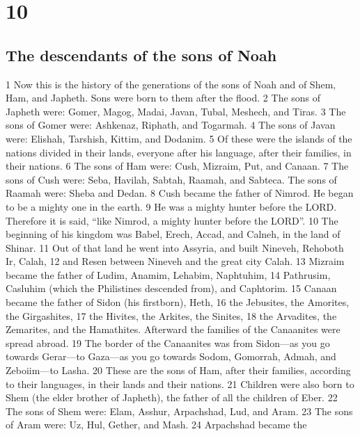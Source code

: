 \hypertarget{section-9}{%
\section{10}\label{section-9}}

\hypertarget{the-descendants-of-the-sons-of-noah}{%
\subsection{The descendants of the sons of
Noah}\label{the-descendants-of-the-sons-of-noah}}

{1} Now this is the history of the generations of the sons of Noah and
of Shem, Ham, and Japheth. Sons were born to them after the flood. {2}
The sons of Japheth were: Gomer, Magog, Madai, Javan, Tubal, Meshech,
and Tiras. {3} The sons of Gomer were: Ashkenaz, Riphath, and Togarmah.
{4} The sons of Javan were: Elishah, Tarshish, Kittim, and Dodanim. {5}
Of these were the islands of the nations divided in their lands,
everyone after his language, after their families, in their nations. {6}
The sons of Ham were: Cush, Mizraim, Put, and Canaan. {7} The sons of
Cush were: Seba, Havilah, Sabtah, Raamah, and Sabteca. The sons of
Raamah were: Sheba and Dedan. {8} Cush became the father of Nimrod. He
began to be a mighty one in the earth. {9} He was a mighty hunter before
the LORD. Therefore it is said, ``like Nimrod, a mighty hunter before
the LORD''. {10} The beginning of his kingdom was Babel, Erech, Accad,
and Calneh, in the land of Shinar. {11} Out of that land he went into
Assyria, and built Nineveh, Rehoboth Ir, Calah, {12} and Resen between
Nineveh and the great city Calah. {13} Mizraim became the father of
Ludim, Anamim, Lehabim, Naphtuhim, {14} Pathrusim, Casluhim (which the
Philistines descended from), and Caphtorim. {15} Canaan became the
father of Sidon (his firstborn), Heth, {16} the Jebusites, the Amorites,
the Girgashites, {17} the Hivites, the Arkites, the Sinites, {18} the
Arvadites, the Zemarites, and the Hamathites. Afterward the families of
the Canaanites were spread abroad. {19} The border of the Canaanites was
from Sidon---as you go towards Gerar---to Gaza---as you go towards
Sodom, Gomorrah, Admah, and Zeboiim---to Lasha. {20} These are the sons
of Ham, after their families, according to their languages, in their
lands and their nations. {21} Children were also born to Shem (the elder
brother of Japheth), the father of all the children of Eber. {22} The
sons of Shem were: Elam, Asshur, Arpachshad, Lud, and Aram. {23} The
sons of Aram were: Uz, Hul, Gether, and Mash. {24} Arpachshad became the
